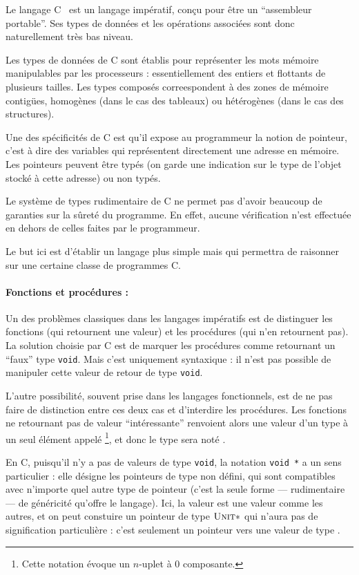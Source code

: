 Le langage C~\cite{KandR} est un langage impératif, conçu pour être un
``assembleur portable''. Ses types de données et les opérations associées sont
donc naturellement très bas niveau.

Les types de données de C sont établis pour représenter les mots mémoire
manipulables par les processeurs : essentiellement des entiers et flottants de
plusieurs tailles. Les types composés correespondent à des zones de mémoire
contigües, homogènes (dans le cas des tableaux) ou hétérogènes (dans le cas des
structures).

Une des spécificités de C est qu'il expose au programmeur la notion de pointeur,
c'est à dire des variables qui représentent directement une adresse en mémoire.
Les pointeurs peuvent être typés (on garde une indication sur le type de l'objet
stocké à cette adresse) ou non typés.

Le système de types rudimentaire de C ne permet pas d'avoir beaucoup de
garanties sur la sûreté du programme. En effet, aucune vérification n'est
effectuée en dehors de celles faites par le programmeur.

Le but ici est d'établir un langage plus simple mais qui permettra de raisonner
sur une certaine classe de programmes C.


\paragraph{Fonctions et procédures :} Un des problèmes classiques dans les
langages impératifs est de distinguer les fonctions (qui retournent une valeur)
et les procédures (qui n'en retournent pas). La solution choisie par C est de
marquer les procédures comme retournant un ``faux'' type \texttt{void}. Mais
c'est uniquement syntaxique : il n'est pas possible de manipuler cette valeur de
retour de type \texttt{void}.

L'autre possibilité, souvent prise dans les langages fonctionnels, est de ne pas
faire de distinction entre ces deux cas et d'interdire les procédures. Les
fonctions ne retournant pas de valeur ``intéressante'' renvoient alors une
valeur d'un type à un seul élément appelé \eUnit\footnote{Cette notation évoque
un $n$-uplet à 0 composante.}, et donc le type sera noté \tUnit.

En C, puisqu'il n'y a pas de valeurs de type \texttt{void}, la notation
\texttt{void *} a un sens particulier : elle désigne les pointeurs de type non
défini, qui sont compatibles avec n'importe quel autre type de pointeur (c'est
la seule forme --- rudimentaire --- de généricité qu'offre le langage). Ici, la
valeur \eUnit est une valeur comme les autres, et on peut constuire un pointeur
de type $\textsc{Unit} *$ qui n'aura pas de signification particulière : c'est
seulement un pointeur vers une valeur de type \tUnit.

